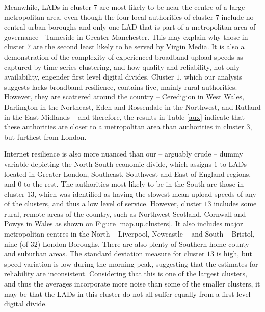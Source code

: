 \documentclass[Royal,times,sageh]{sagej}
\begin{document}
Meanwhile, LADs in cluster \(7\) are most likely to be near the centre
of a large metropolitan area, even though the four local authorities of
cluster \(7\) include no central urban boroughs and only one LAD that is
part of a metropolitan area of governance - Tameside in Greater
Manchester. This may explain why those in cluster \(7\) are the second
least likely to be served by Virgin Media. It is also a demonstration of
the complexity of experienced broadband upload speeds as captured by
time-series clustering, and how quality and reliability, not only
availability, engender first level digital divides. Cluster \(1\), which
our analysis suggests lacks broadband resilience, contains five, mainly
rural authorities. However, they are scattered around the country --
Ceredigion in West Wales, Darlington in the Northeast, Eden and
Rossendale in the Northwest, and Rutland in the East Midlands -- and
therefore, the results in Table \ref{aux} indicate that these
authorities are closer to a metropolitan area than authorities in
cluster \(3\), but furthest from London.

Internet resilience is also more nuanced than our -- arguably crude --
dummy variable depicting the North-South economic divide, which assigns
\(1\) to LADs located in Greater London, Southeast, Southwest and East
of England regions, and \(0\) to the rest. The authorities most likely
to be in the South are those in cluster \(13\), which was identified as
having the slowest mean upload speeds of any of the clusters, and thus a
low level of service. However, cluster \(13\) includes some rural,
remote areas of the country, such as Northwest Scotland, Cornwall and
Powys in Wales as shown on Figure \ref{map.up.clusters}. It also
includes major metropolitan centres in the North -- Liverpool, Newcastle
-- and South -- Bristol, nine (of \(32\)) London Boroughs. There are
also plenty of Southern home county and suburban areas. The standard
deviation measure for cluster \(13\) is high, but speed variation is low
during the morning peak, suggesting that the estimates for reliability
are inconsistent. Considering that this is one of the largest clusters,
and thus the averages incorporate more noise than some of the smaller
clusters, it may be that the LADs in this cluster do not all suffer
equally from a first level digital divide.
\end{document}
